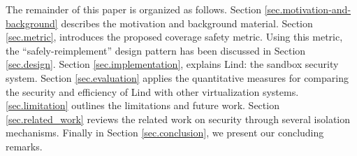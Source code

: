 The remainder of this paper is organized as follows. 
Section \ref{sec.motivation-and-background} describes the motivation and background material. Section \ref{sec.metric}, introduces the proposed coverage safety metric. Using this metric, the 
``safely-reimplement'' design pattern has been discussed in Section \ref{sec.design}. Section \ref{sec.implementation}, explains Lind: the sandbox security system. Section \ref{sec.evaluation} applies the quantitative  measures for comparing the security and efficiency of Lind with other virtualization systems. \ref{sec.limitation} outlines the limitations and future work. Section \ref{sec.related_work} reviews the related work on security through several isolation mechanisms. Finally in Section \ref{sec.conclusion}, we present our concluding remarks.


